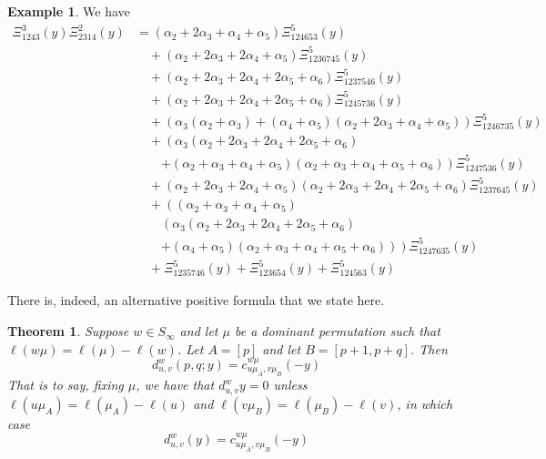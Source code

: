 \documentclass{amsart}
\newtheorem{theorem}{Theorem}[section]
\theoremstyle{definition}
\newtheorem{example}[lemma]{Example}
\theoremstyle{remark}
\numberwithin{equation}{subsection}
\newcommand{\dsch}{\ensuremath{\Xi}}
\begin{document}
\begin{example}
We have
  \begin{align*}
\dsch_{1243}^3(y)\dsch_{2314}^2(y)&=\left(\alpha_{2} + 2 \alpha_{3} + \alpha_{4} + \alpha_{5}\right) \Xi_{124653}^{5}(y) \\
&\quad + \left(\alpha_{2} + 2 \alpha_{3} + 2 \alpha_{4} + \alpha_{5}\right) \Xi_{1236745}^{5}(y) \\
&\quad + \left(\alpha_{2} + 2 \alpha_{3} + 2 \alpha_{4} + 2 \alpha_{5} + \alpha_{6}\right) \Xi_{1237546}^{5}(y) \\
&\quad + \left(\alpha_{2} + 2 \alpha_{3} + 2 \alpha_{4} + 2 \alpha_{5} + \alpha_{6}\right) \Xi_{1245736}^{5}(y) \\
&\quad + \left(\alpha_{3}(\alpha_{2} + \alpha_{3}) + (\alpha_{4} + \alpha_{5})(\alpha_{2} + 2\alpha_{3} + \alpha_{4} + \alpha_{5})\right) \Xi_{1246735}^{5}(y) \\
&\quad + \left(\alpha_{3}(\alpha_{2} + 2\alpha_{3} + 2\alpha_{4} + 2\alpha_{5} + \alpha_{6})\right. \\
&\quad\quad \left. + (\alpha_{2} + \alpha_{3} + \alpha_{4} + \alpha_{5})(\alpha_{2} + \alpha_{3} + \alpha_{4} + \alpha_{5} + \alpha_{6})\right) \Xi_{1247536}^{5}(y) \\
&\quad + \left(\alpha_{2} + 2 \alpha_{3} + 2 \alpha_{4} + \alpha_{5}\right) \left(\alpha_{2} + 2 \alpha_{3} + 2 \alpha_{4} + 2 \alpha_{5} + \alpha_{6}\right) \Xi_{1237645}^{5}(y) \\
&\quad + \left((\alpha_{2} + \alpha_{3} + \alpha_{4} + \alpha_{5})\right. \\
&\quad\quad \left.\left(\alpha_{3}(\alpha_{2} + 2\alpha_{3} + 2\alpha_{4} + 2\alpha_{5} + \alpha_{6})\right.\right. \\
&\quad\quad \left.\left. + (\alpha_{4} + \alpha_{5})(\alpha_{2} + \alpha_{3} + \alpha_{4} + \alpha_{5} + \alpha_{6})\right)\right) \Xi_{1247635}^{5}(y) \\
&\quad + \Xi_{1235746}^{5}(y) + \Xi_{123654}^{5}(y) + \Xi_{124563}^{5}(y)
\end{align*}
\end{example}

There is, indeed, an alternative positive formula that we state here.
\begin{theorem}\label{theorem:doublecoprodpos}
Suppose $w\in S_\infty$ and let $\mu$ be a dominant permutation such that $\ell(w\mu)=\ell(\mu)-\ell(w)$. Let $A=[p]$ and let $B=[p+1,p+q]$. Then
$$d_{u,v}^w(p,q;y) = c_{u\mu_A,v\mu_B}^{w\mu}(-y)$$
That is to say, fixing $\mu$, we have that $d_{u,v}^w{y}=0$ unless $\ell(u\mu_A)=\ell(\mu_A)-\ell(u)$ and $\ell(v\mu_B)=\ell(\mu_B)-\ell(v)$, in which case
$$d_{u,v}^w(y)=c_{u\mu_A,v\mu_B}^{w\mu}(-y)$$
\end{theorem}
\end{document}
